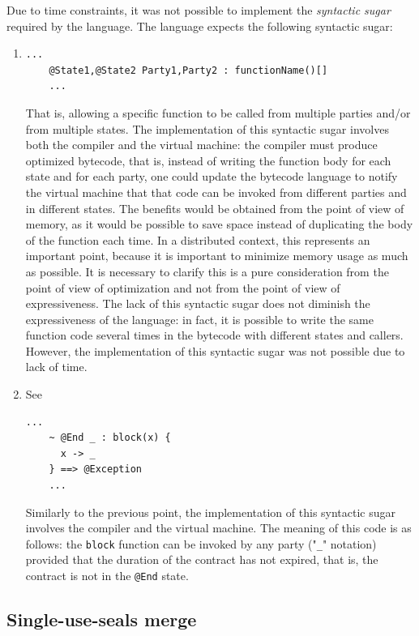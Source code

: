 \label{syntactic-sugar}
Due to time constraints, it was not possible to implement the \textit{syntactic sugar} required by the 
language. The language expects the following syntactic sugar:
\begin{enumerate}
  \item 
  \begin{Verbatim}[xleftmargin=2cm]
    ...
    @State1,@State2 Party1,Party2 : functionName()[]
    ...
  \end{Verbatim}

  That is, allowing a specific function to be called from multiple parties and/or from multiple states. The 
  implementation of this syntactic sugar involves both the compiler and the virtual machine: the compiler 
  must produce optimized bytecode, that is, instead of writing the function body for each state and for each 
  party, one could update the bytecode language to notify the virtual machine that that code can be invoked 
  from different parties and in different states. The benefits would be obtained from the point of view of 
  memory, as it would be possible to save space instead of duplicating the body of the function each time. 
  In a distributed context, this represents an important point, because it is important to minimize memory 
  usage as much as possible. It is necessary to clarify this is a pure consideration from the point of 
  view of optimization and not from the point of view of expressiveness. The lack of this syntactic sugar 
  does not diminish the expressiveness of the language: in fact, it is possible to write the same function 
  code several times in the bytecode with different states and callers. However, the implementation of 
  this syntactic sugar was not possible due to lack of time.
  \item See \cite{site:stipula-programming-legal-contracts}
  \begin{Verbatim}[xleftmargin=2cm]
    ...
    ~ @End _ : block(x) {
      x -> _
    } ==> @Exception
    ...
  \end{Verbatim}

  Similarly to the previous point, the implementation of this syntactic sugar involves the compiler and the 
  virtual machine. The meaning of this code is as follows: the \verb|block| function can be invoked by any 
  party ("\verb|_|" notation) provided that the duration of the contract has not expired, that is, the 
  contract is not in the \verb|@End| state.
\end{enumerate}

\subsection{Single-use-seals merge}
\label{single-use-seals-merge}

